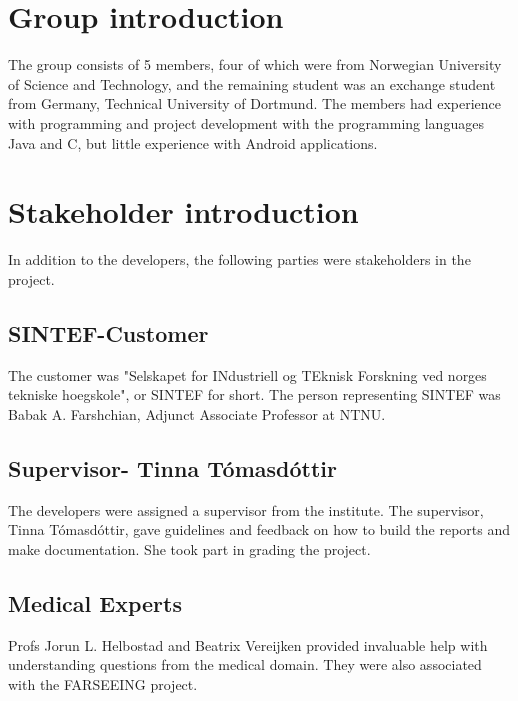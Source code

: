\section{Group introduction}
The group consists of 5 members, four of which were from Norwegian University of Science and Technology, and the remaining student was an exchange student from Germany, Technical University of Dortmund. The members had experience with programming and project development with the programming languages Java and C$  $, but little experience with Android applications. 

\section{Stakeholder introduction}
In addition to the developers, the following parties were stakeholders in the project.
\subsection{SINTEF-Customer}
The customer was "Selskapet for INdustriell og TEknisk Forskning ved norges tekniske hoegskole", or SINTEF for short. The person representing SINTEF was Babak A. Farshchian, Adjunct Associate Professor at NTNU.
\subsection{Supervisor- Tinna T\'{o}masd\'{o}ttir}
The developers were assigned a supervisor from the institute. The supervisor, Tinna T\'{o}masd\'{o}ttir, gave guidelines and feedback on how to build the reports and make documentation. She took part in grading the project. 
\subsection{Medical Experts}
Profs Jorun L. Helbostad and Beatrix Vereijken provided invaluable help with understanding questions from the medical domain. They were also associated with the FARSEEING project. 